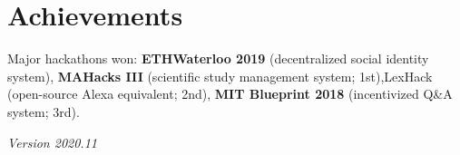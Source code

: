 \documentclass[paper=letter]{tccv}
\begin{document}
\section{Achievements}

Major hackathons won: \textbf{ETHWaterloo 2019} (decentralized social identity
system), \textbf{MAHacks III} (scientific study management system; 1st),LexHack
(open-source Alexa equivalent; 2nd), \textbf{MIT Blueprint 2018} (incentivized
Q\&A system; 3rd).

\mbox{}
\vfill
\begin{flushright}
    \textit{Version 2020.11}
\end{flushright}
\end{document}

